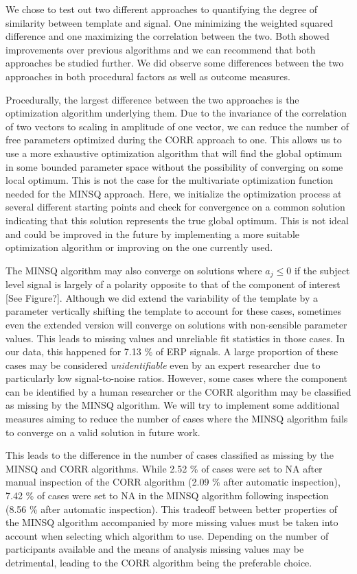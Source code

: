 \documentclass[
  man]{apa7}
\begin{document}
We chose to test out two different approaches to quantifying the degree of similarity between template and signal. One minimizing the weighted squared difference and one maximizing the correlation between the two. Both showed improvements over previous algorithms and we can recommend that both approaches be studied further. We did observe some differences between the two approaches in both procedural factors as well as outcome measures.

Procedurally, the largest difference between the two approaches is the optimization algorithm underlying them. Due to the invariance of the correlation of two vectors to scaling in amplitude of one vector, we can reduce the number of free parameters optimized during the CORR approach to one. This allows us to use a more exhaustive optimization algorithm that will find the global optimum in some bounded parameter space without the possibility of converging on some local optimum. This is not the case for the multivariate optimization function needed for the MINSQ approach. Here, we initialize the optimization process at several different starting points and check for convergence on a common solution indicating that this solution represents the true global optimum. This is not ideal and could be improved in the future by implementing a more suitable optimization algorithm or improving on the one currently used.

The MINSQ algorithm may also converge on solutions where \(a_j \le 0\) if the subject level signal is largely of a polarity opposite to that of the component of interest {[}See Figure?{]}. Although we did extend the variability of the template by a parameter vertically shifting the template to account for these cases, sometimes even the extended version will converge on solutions with non-sensible parameter values. This leads to missing values and unreliable fit statistics in those cases. In our data, this happened for 7.13 \% of ERP signals. A large proportion of these cases may be considered \emph{unidentifiable} even by an expert researcher due to particularly low signal-to-noise ratios. However, some cases where the component can be identified by a human researcher or the CORR algorithm may be classified as missing by the MINSQ algorithm. We will try to implement some additional measures aiming to reduce the number of cases where the MINSQ algorithm fails to converge on a valid solution in future work.

This leads to the difference in the number of cases classified as missing by the MINSQ and CORR algorithms. While 2.52 \% of cases were set to NA after manual inspection of the CORR algorithm (2.09 \% after automatic inspection), 7.42 \% of cases were set to NA in the MINSQ algorithm following inspection (8.56 \% after automatic inspection). This tradeoff between better properties of the MINSQ algorithm accompanied by more missing values must be taken into account when selecting which algorithm to use. Depending on the number of participants available and the means of analysis missing values may be detrimental, leading to the CORR algorithm being the preferable choice.
\end{document}
